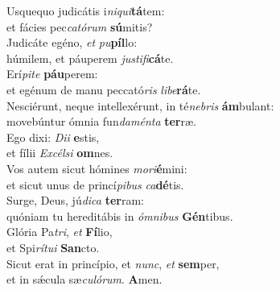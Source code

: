 \evenverse Usquequo judicátis i\textit{ni}\textit{qui}\textbf{tá}tem:~\*\\
\evenverse et fácies pec\textit{ca}\textit{tó}\textit{rum} \textbf{sú}mitis?\\
\oddverse Judicáte egéno, \textit{et} \textit{pu}\textbf{píl}lo:~\*\\
\oddverse húmilem, et páuperem \textit{ju}\textit{sti}\textit{fi}\textbf{cá}te.\\
\evenverse Erí\textit{pi}\textit{te} \textbf{páu}perem:~\*\\
\evenverse et egénum de manu peccató\textit{ris} \textit{li}\textit{be}\textbf{rá}te.\\
\oddverse Nesciérunt, neque intellexérunt, in té\textit{ne}\textit{bris} \textbf{ám}bulant:~\*\\
\oddverse movebúntur ómnia fun\textit{da}\textit{mén}\textit{ta} \textbf{ter}ræ.\\
\evenverse Ego dixi: \textit{Di}\textit{i} \textbf{e}stis,~\*\\
\evenverse et fílii \textit{Ex}\textit{cél}\textit{si} \textbf{om}nes.\\
\oddverse Vos autem sicut hómines \textit{mo}\textit{ri}\textbf{é}mini:~\*\\
\oddverse et sicut unus de princí\textit{pi}\textit{bus} \textit{ca}\textbf{dé}tis.\\
\evenverse Surge, Deus, jú\textit{di}\textit{ca} \textbf{ter}ram:~\*\\
\evenverse quóniam tu hereditábis in \textit{óm}\textit{ni}\textit{bus} \textbf{Gén}tibus.\\
\oddverse Glória Pa\textit{tri}, \textit{et} \textbf{Fí}lio,~\*\\
\oddverse et Spi\textit{rí}\textit{tu}\textit{i} \textbf{San}cto.\\
\evenverse Sicut erat in princípio, et \textit{nunc}, \textit{et} \textbf{sem}per,~\*\\
\evenverse et in sǽcula sæ\textit{cu}\textit{ló}\textit{rum}. \textbf{A}men.\\
